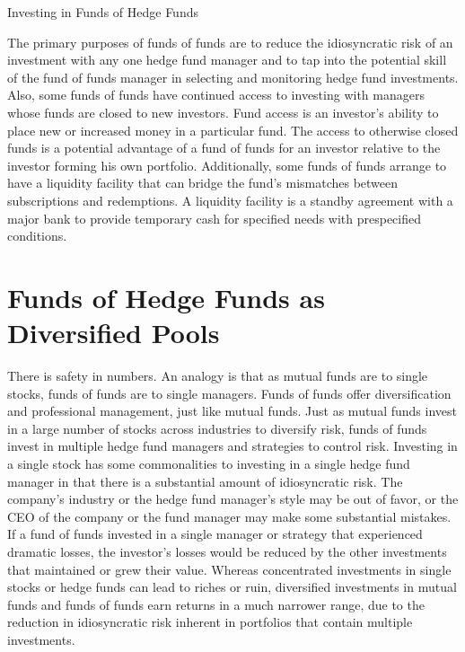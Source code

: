 \documentclass[11pt]{article}
\begin{document}
Investing in Funds of Hedge Funds

The primary purposes of funds of funds are to reduce the idiosyncratic risk of an investment with any one hedge fund manager and to tap into the potential skill of the fund of funds manager in selecting and monitoring hedge fund investments. Also, some funds of funds have continued access to investing with managers whose funds are closed to new investors. Fund access is an investor's ability to place new or increased money in a particular fund. The access to otherwise closed funds is a potential advantage of a fund of funds for an investor relative to the investor forming his own portfolio. Additionally, some funds of funds arrange to have a liquidity facility that can bridge the fund's mismatches between subscriptions and redemptions. A liquidity facility is a standby agreement with a major bank to provide temporary cash for specified needs with prespecified conditions.

\section*{Funds of Hedge Funds as Diversified Pools}
There is safety in numbers. An analogy is that as mutual funds are to single stocks, funds of funds are to single managers. Funds of funds offer diversification and professional management, just like mutual funds. Just as mutual funds invest in a large number of stocks across industries to diversify risk, funds of funds invest in multiple hedge fund managers and strategies to control risk. Investing in a single stock has some commonalities to investing in a single hedge fund manager in that there is a substantial amount of idiosyncratic risk. The company's industry or the hedge fund manager's style may be out of favor, or the CEO of the company or the fund manager may make some substantial mistakes. If a fund of funds invested in a single manager or strategy that experienced dramatic losses, the investor's losses would be reduced by the other investments that maintained or grew their value. Whereas concentrated investments in single stocks or hedge funds can lead to riches or ruin, diversified investments in mutual funds and funds of funds earn returns in a much narrower range, due to the reduction in idiosyncratic risk inherent in portfolios that contain multiple investments.
\end{document}
